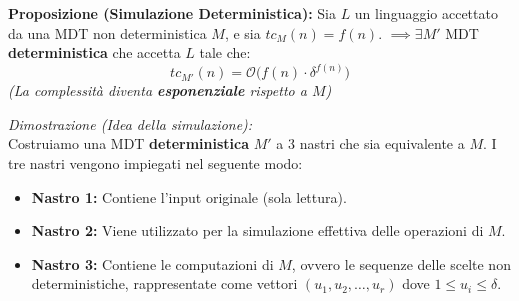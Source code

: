 \begin{center}
    \end{center}

\vspace{0.4cm}
\textbf{Proposizione (Simulazione Deterministica):} 
Sia $L$ un linguaggio accettato da una MDT non deterministica $M$, e sia $tc_M(n) = f(n)$. 
$\implies \exists M'$ MDT \textbf{deterministica} che accetta $L$ tale che:
$$ tc_{M'}(n) = \mathcal{O}\Big(f(n) \cdot \delta^{f(n)}\Big) $$
\textit{(La complessità diventa \textbf{esponenziale} rispetto a $M$)}

\vspace{0.2cm}
\vspace{0.2cm}
\textit{Dimostrazione (Idea della simulazione):} \\
Costruiamo una MDT \textbf{deterministica} $M'$ a 3 nastri che sia equivalente a $M$. I tre nastri vengono impiegati nel seguente modo:
\begin{itemize}
    \item \textbf{Nastro 1:} Contiene l'input originale (sola lettura).
    \item \textbf{Nastro 2:} Viene utilizzato per la simulazione effettiva delle operazioni di $M$.
    \item \textbf{Nastro 3:} Contiene le computazioni di $M$, ovvero le sequenze delle scelte non deterministiche, rappresentate come vettori $(u_1, u_2, \dots, u_r)$ dove $1 \le u_i \le \delta$.
\end{itemize}

